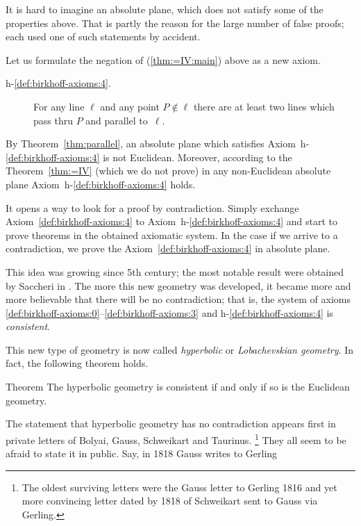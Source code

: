 It is hard to imagine an absolute plane, which does not satisfy some of the properties above.
That is partly the reason for the large number of false proofs;
each used one of such statements by accident.

Let us formulate the negation of (\ref{thm:=IV:main}) above as a new axiom.


\begin{framed}
\begin{description}
\item[{\rm h-$\!$\ref{def:birkhoff-axioms:4}.}]\label{def:hyperbolic-4a}  
For any line $\ell$ and any point $P\notin\ell$ 
there are at least two lines which pass thru $P$ 
and parallel to~$\ell$.
\end{description}
\end{framed}

By Theorem~\ref{thm:parallel}, an absolute plane which satisfies Axiom~h-$\!$\ref{def:birkhoff-axioms:4} is not Euclidean. 
Moreover, according to the Theorem~\ref{thm:=IV} (which we do not prove) 
in any non-Euclidean absolute plane Axiom~h-$\!$\ref{def:birkhoff-axioms:4} holds.

It opens a way to look for a proof by contradiction.
Simply exchange  Axiom~\ref{def:birkhoff-axioms:4} to Axiom~h-$\!$\ref{def:birkhoff-axioms:4}
 and start to prove theorems in the obtained axiomatic system.
In the case if we arrive to a contradiction, 
we prove the Axiom~\ref{def:birkhoff-axioms:4} in absolute plane.  

This idea was growing since 5th century;
the most notable result were obtained by Saccheri in \cite{saccheri}.
The more this new geometry was developed,
it became more and more believable that there will be no contradiction;
that is, the system of axioms \ref{def:birkhoff-axioms:0}--\ref{def:birkhoff-axioms:3} and h-$\!$\ref{def:birkhoff-axioms:4} is \emph{consistent}.

This new type of geometry is now called \emph{hyperbolic} or  \emph{Lobachevskian geometry}.
In fact, the following theorem holds.

\begin{thm}{Theorem}\label{thm:consistent}
The hyperbolic geometry is consistent if and only if so is the Euclidean geometry.
\end{thm}

The statement
that hyperbolic geometry has no contradiction appears first in private letters of
Bolyai,  Gauss, Schweikart and Taurinus.%
\footnote{The oldest surviving letters were the Gauss letter to Gerling 1816 
and yet more convincing letter dated by 1818 
of Schweikart sent to Gauss via Gerling.}
They all seem to be afraid to state it in public.
Say, in 1818  
Gauss writes to Gerling

